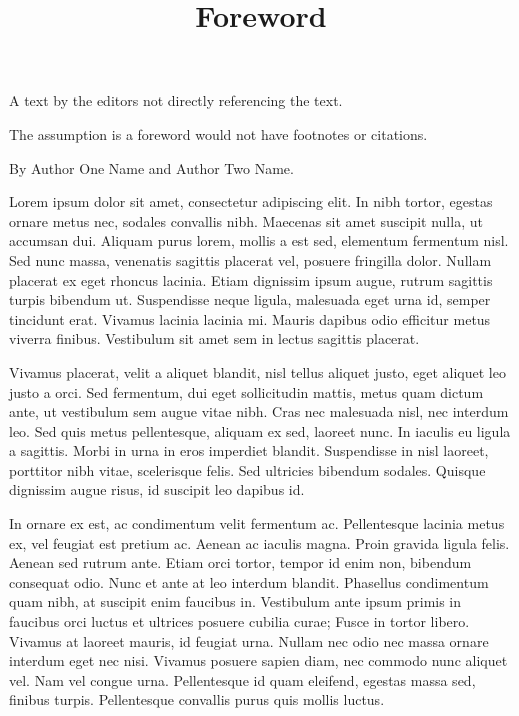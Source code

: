 \documentclass{article}
\begin{document}
\title{Foreword}

\maketitle


A text by the editors not directly referencing the text.


The assumption is a foreword would not have footnotes or citations.


By Author One Name and Author Two Name.


Lorem ipsum dolor sit amet, consectetur adipiscing elit. In nibh tortor, egestas ornare metus nec, sodales convallis nibh. Maecenas sit amet suscipit nulla, ut accumsan dui. Aliquam purus lorem, mollis a est sed, elementum fermentum nisl. Sed nunc massa, venenatis sagittis placerat vel, posuere fringilla dolor. Nullam placerat ex eget rhoncus lacinia. Etiam dignissim ipsum augue, rutrum sagittis turpis bibendum ut. Suspendisse neque ligula, malesuada eget urna id, semper tincidunt erat. Vivamus lacinia lacinia mi. Mauris dapibus odio efficitur metus viverra finibus. Vestibulum sit amet sem in lectus sagittis placerat.


Vivamus placerat, velit a aliquet blandit, nisl tellus aliquet justo, eget aliquet leo justo a orci. Sed fermentum, dui eget sollicitudin mattis, metus quam dictum ante, ut vestibulum sem augue vitae nibh. Cras nec malesuada nisl, nec interdum leo. Sed quis metus pellentesque, aliquam ex sed, laoreet nunc. In iaculis eu ligula a sagittis. Morbi in urna in eros imperdiet blandit. Suspendisse in nisl laoreet, porttitor nibh vitae, scelerisque felis. Sed ultricies bibendum sodales. Quisque dignissim augue risus, id suscipit leo dapibus id.


In ornare ex est, ac condimentum velit fermentum ac. Pellentesque lacinia metus ex, vel feugiat est pretium ac. Aenean ac iaculis magna. Proin gravida ligula felis. Aenean sed rutrum ante. Etiam orci tortor, tempor id enim non, bibendum consequat odio. Nunc et ante at leo interdum blandit. Phasellus condimentum quam nibh, at suscipit enim faucibus in. Vestibulum ante ipsum primis in faucibus orci luctus et ultrices posuere cubilia curae; Fusce in tortor libero. Vivamus at laoreet mauris, id feugiat urna. Nullam nec odio nec massa ornare interdum eget nec nisi. Vivamus posuere sapien diam, nec commodo nunc aliquet vel. Nam vel congue urna. Pellentesque id quam eleifend, egestas massa sed, finibus turpis. Pellentesque convallis purus quis mollis luctus.
\end{document}
